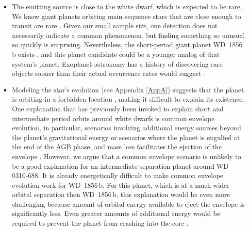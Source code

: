 \documentclass[twocolumn]{aastex631}
\begin{document}
\begin{itemize}
    \item The emitting source is close to the white dwarf, which is expected to be rare. We know giant planets orbiting main sequence stars that are close enough to transit are rare \citep{2018MNRAS.474.4603V,2024arXiv240721743R}. Given our small sample size, one detection does not necessarily indicate a common phenomenon, but finding something so unusual so quickly is surprising. Nevertheless, the short-period giant planet WD~1856\,b exists \citep{Vanderburg_2020}, and this planet candidate could be a younger analog of that system's planet. Exoplanet astronomy has a history of discovering rare objects sooner than their actual occurrence rates would suggest \citep{2006Sci...314.1908G,2009Natur.462..891C,2015Natur.526..546V,2016Natur.533..221G}. 
    \item  Modeling the star's evolution (see Appendix \ref{AppA}) suggests that the planet is orbiting in a forbidden location \citep{Nordhaus2013MNRAS}, making it difficult to explain its existence. One explanation that has previously been invoked to explain short and intermediate period orbits around white dwarfs is common envelope evolution, in particular, scenarios involving additional energy sources beyond the planet's gravitational energy  \citep{2021MNRAS.501..676L,2021MNRAS.502L.110C, Merlov2021ApJL} or scenarios where the planet is engulfed at the end of the AGB phase, and mass loss facilitates the ejection of the envelope \citep{2024MNRAS.52711719Y}. However, we argue that a common envelope scenario is unlikely to be a good explanation for an intermediate-separation planet around WD 0310-688. It is already energetically difficult to make common envelope evolution work for WD~1856\,b. For this planet, which is at a much wider orbital separation then WD~1856\,b, this explanation would be even more challenging because amount of orbital energy available to eject the envelope is significantly less. Even greater amounts of additional energy would be required to prevent the planet from crashing into the core \citep{2021MNRAS.501..676L,2021MNRAS.502L.110C, Merlov2021ApJL}. 
    

\end{itemize}
\end{document}
